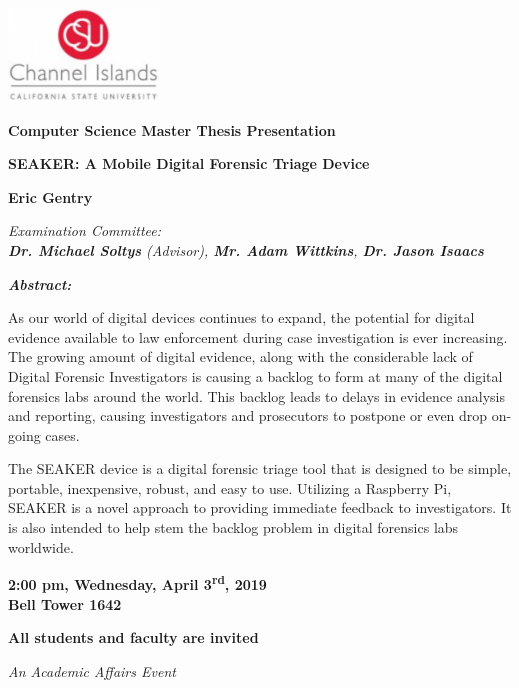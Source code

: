 \documentclass{article}
\begin{document}
\begin{center}

\includegraphics[width=0.3\textwidth]{CI_Logo.png}\\

\hfill\break

\LARGE
\textbf{\color{grey}Computer Science Master Thesis Presentation}\\

\hfill\break
\hfill\break

\Large
{\bf SEAKER: A Mobile Digital Forensic Triage Device}\\

\vspace{5mm}

\large
{\bf Eric Gentry}\\

\vspace{5mm}

\large
\textit{ Examination Committee:\\
{\bf Dr. Michael Soltys} (Advisor), {\bf Mr. Adam Wittkins}, {\bf
Dr. Jason Isaacs}}\\

\hfill\break

\end{center}

\begin{adjustwidth}{1in}{1in}
\textit{\bf Abstract:}\\

\vspace{3mm}

\normalsize
\noindent As our world of digital devices continues to
expand, the potential for digital evidence available to
law enforcement during case investigation is ever increasing.
The growing amount of digital evidence, along with the
considerable lack of Digital Forensic Investigators is
causing a backlog to form at many of the digital forensics
labs around the world. This backlog leads to delays in
evidence analysis and reporting, causing investigators and
prosecutors to postpone or even drop on-going cases.

The SEAKER device is a digital forensic triage tool that is
designed to be simple, portable, inexpensive, robust, and
easy to use. Utilizing a Raspberry Pi,
SEAKER is a novel approach to
providing immediate feedback to investigators. It is also
intended to help stem the backlog problem in digital
forensics labs worldwide.
\end{adjustwidth}

\hfill\break

\begin{center}

\LARGE
{\bf 2:00 pm, Wednesday, April 3\textsuperscript{rd}, 2019\\
Bell Tower 1642}\\

\vspace{15mm}

\large
{\bf All students and faculty are invited}\\

\hfill\break

\small
{\it An Academic Affairs Event}

\end{center}
\end{document}
